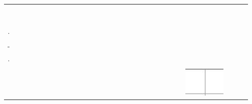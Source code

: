 \documentclass[10pt]{article}
\begin{document}
\begin{center}
\begin{tabular}{|c|c|c|c|c|c|c|c|c|c|c|c|c|c|c|c|c|c|c|c|c|c|c|c|c|c|c|c|c|}
\hline
 &  &  &  &  &  &  &  &  &  &  &  &  &  &  &  &  &  &  &  &  &  &  &  &  &  &  &  &  \\
\hline
 &  &  &  &  &  &  &  &  &  &  &  &  &  &  &  &  &  &  &  &  &  &  &  &  &  &  &  &  \\
\hline
 &  &  &  &  &  &  &  &  &  &  &  &  &  &  &  &  &  &  &  &  &  &  &  &  &  &  &  &  \\
\hline
 &  &  &  &  &  &  &  &  &  &  &  &  &  &  &  &  &  &  &  &  &  &  &  &  &  &  &  &  \\
\hline
 &  &  &  &  &  &  &  &  &  &  &  &  &  &  &  &  &  &  &  &  &  &  &  &  &  &  &  &  \\
\hline
 &  &  &  &  &  &  &  &  &  &  &  &  &  &  &  &  &  &  &  &  &  &  &  &  &  &  &  &  \\
\hline
 &  &  &  &  &  &  &  &  &  &  &  &  &  &  &  &  &  &  &  &  &  &  &  &  &  &  &  &  \\
\hline
 &  &  &  &  &  &  &  &  &  &  &  &  &  &  &  &  &  &  &  &  &  &  &  &  &  &  &  &  \\
\hline
 &  &  &  &  &  &  &  &  &  &  &  &  &  &  &  &  &  &  &  &  &  &  &  &  &  &  &  &  \\
\hline
. &  &  &  &  &  &  &  &  &  &  &  &  &  &  &  &  &  &  &  &  &  &  &  &  &  &  &  &  \\
\hline
 &  &  &  &  &  &  &  &  &  &  &  &  &  &  &  &  &  &  &  &  &  &  &  &  &  &  &  &  \\
\hline
- &  &  &  &  &  &  &  &  &  &  &  &  &  &  &  &  &  &  &  &  &  &  &  &  &  &  &  &  \\
\hline
. &  &  &  &  &  &  &  &  &  &  &  &  &  &  &  &  &  &  &  &  &  &  &  &  &  &  &  &  \\
\hline
 &  &  &  &  &  &  &  &  &  &  &  &  &  &  &  &  &  &  &  &  &  &  &  &  &  &  &  &  \\
\hline
 &  &  &  &  &  &  &  &  &  &  &  &  &  &  &  &  &  &  &  &  &  &  &  &  & \includegraphics[max width=\textwidth]{2024_11_21_599d917d55a506aace4bg-06}

\end{tabular}
\end{center}
\end{document}
